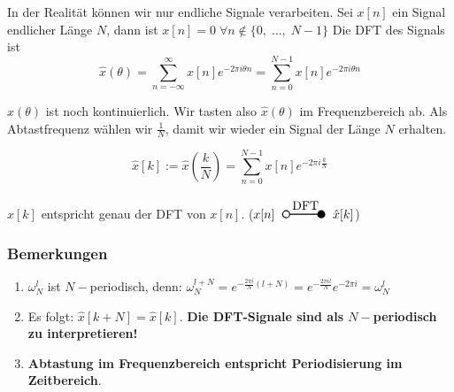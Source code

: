 \documentclass[11pt]{article}
\newcommand{\transform}[2]{%
    \begin{tikzpicture}
        \draw[thick] (0,0) circle (0.1);
        \draw[thick] (0.1,0) -- (#2,0) node[midway, above] {#1};
        \filldraw[thick] (#2,0) circle (0.1);
    \end{tikzpicture}%
}
\begin{document}
In der Realität können wir nur endliche Signale verarbeiten. Sei $x[n]$ ein Signal endlicher Länge $N$, dann ist $x[n]=0 \; \forall n \notin \{ 0, \; \dots, \; N-1 \}$
Die DFT des Signals ist
$$\hat{x}(\theta) = \sum_{n=-\infty}^\infty x[n]e^{-2 \pi i \theta n} = \sum_{n=0}^{N-1} x[n]e^{-2 \pi i \theta n}$$

$\hat{x}(\theta)$ ist noch kontinuierlich. Wir tasten also $\hat{x}(\theta)$ im Frequenzbereich ab. Als Abtastfrequenz wählen wir $\frac{1}{N}$, damit wir wieder ein Signal der Länge $N$ erhalten.

$$\hat{x}[k] := \hat{x}\left(\frac{k}{N}\right) = \sum_{n=0}^{N-1} x[n]e^{-2 \pi i \frac{k}{N}} $$

$\hat{x}[k]$ entspricht genau der DFT von $x[n]$. \hspace*{0.5cm} ($x[n] \hspace{6pt} \transform{DFT}{1} \hspace{6pt} \hat{x}[k]$)

%
\subsubsection*{Bemerkungen}
\vspace*{-0.5cm}
\begin{enumerate}
    \item $\omega_N^l$ ist $N-$periodisch, denn: $\omega_N^{l + N} = e^{-\frac{2 \pi i}{N}(l+N)} = e^{-\frac{2 \pi i l}{N}} e^{- 2 \pi i} = \omega_N^l$
    \item Es folgt: $\hat{x}[k+N] = \hat{x}[k]$. \textbf{Die DFT-Signale sind als $N-$periodisch zu interpretieren!}
    \item \textbf{Abtastung im Frequenzbereich entspricht Periodisierung im Zeitbereich}.
\end{enumerate}
\end{document}

